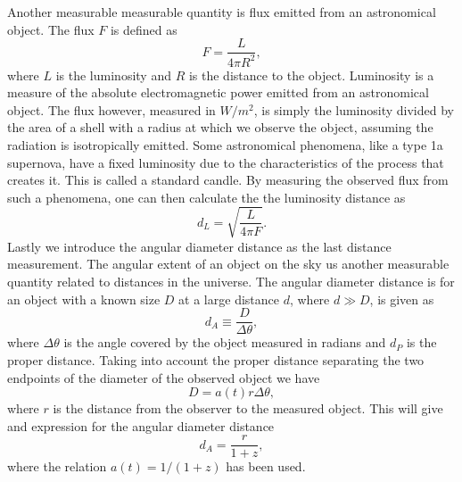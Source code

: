 Another measurable measurable quantity is flux emitted from an astronomical object.
The flux $F$ is defined as
\begin{equation}
    F = \frac{L}{4\pi R^2},
\end{equation}
where $L$ is the luminosity and $R$ is the distance to the object. Luminosity is a measure
of the absolute electromagnetic power emitted from an astronomical object. The flux however, measured in $W/m^2$, is simply the luminosity
divided by the area of a shell with a radius at which we observe the object, assuming the radiation is isotropically emitted. Some astronomical phenomena, like a type 1a supernova, have a fixed luminosity
due to the characteristics of the process that creates it. This is called a standard candle. By measuring the observed flux from such a phenomena, one can then
calculate the the luminosity distance as 
\begin{equation}
    d_L = \sqrt{\frac{L}{4\pi F}}.
\end{equation}
\indent
Lastly we introduce the angular diameter distance as the last distance
measurement. The angular extent of an object on the sky us another measurable quantity related to distances in the universe. The angular diameter distance is for an object with a known size
$D$ at a large distance $d$, where $d\gg D$, is given as 
\begin{equation}
    d_A\equiv \frac{D}{\Delta\theta},
\end{equation}
where $\Delta\theta$ is the angle covered by the object measured in radians and $d_P$ is the proper distance. Taking into account the proper distance separating the two endpoints of the diameter of the observed object we have 
\begin{equation}
    D=a(t)r\Delta\theta,
\end{equation}
where $r$ is the distance from the observer to the measured object.
This will give and expression for the angular diameter distance
\begin{equation}
    d_A = \frac{r}{1+z},
\end{equation}
where the relation $a(t)=1/(1+z)$ has been used.
